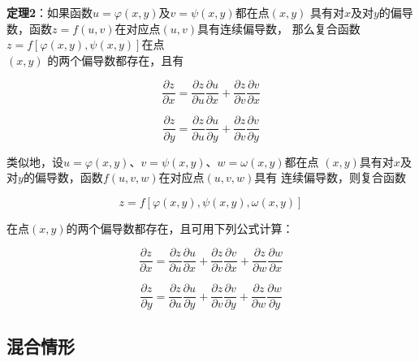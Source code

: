 \documentclass[12pt, a4paper]{article}
\numberwithin{equation}{section}
\begin{document}
    \textbf{定理2}：如果函数\(u=\varphi\left(x,y\right)\)及\(v=\psi\left(x,y\right)\)都在点\(\left(x,y\right)\)
    具有对\(x\)及对\(y\)的偏导数，函数\(z=f\left(u,v\right)\)在对应点\(\left(u,v\right)\)具有连续偏导数，
    那么复合函数\(z=f\left[\varphi\left(x,y\right), \psi\left(x,y\right)\right]\)在点\\\(\left(x,y\right)\)
    的两个偏导数都存在，且有

    \begin{equation}
        \frac{\partial z}{\partial x}=\frac{\partial z}{\partial u} \frac{\partial u}{\partial x}
        +\frac{\partial z}{\partial v} \frac{\partial v}{\partial x}
    \end{equation}

    \begin{equation}
        \frac{\partial z}{\partial y}=\frac{\partial z}{\partial u} \frac{\partial u}{\partial y}
        +\frac{\partial z}{\partial v} \frac{\partial v}{\partial y}
    \end{equation}

    类似地，设\(u=\varphi\left(x,y\right)\)、\(v=\psi\left(x,y\right)\)、\(w=\omega\left(x,y\right)\)都在点
    \(\left(x,y\right)\)具有对\(x\)及对\(y\)的偏导数，函数$f\left(u,v,w\right)$在对应点\(\left(u,v,w\right)\)具有
    连续偏导数，则复合函数
    
    $$
        z=f\left[\varphi(x,y), \psi(x,y), \omega(x,y)\right]
    $$

    在点\(\left(x,y\right)\)的两个偏导数都存在，且可用下列公式计算：

    \begin{equation}
        \frac{\partial z}{\partial x}=\frac{\partial z}{\partial u} \frac{\partial u}{\partial x}+
        \frac{\partial z}{\partial v} \frac{\partial v}{\partial x}+\frac{\partial z}{\partial w} \frac{\partial w}{\partial x}
    \end{equation}

    \begin{equation}
        \frac{\partial z}{\partial y}=\frac{\partial z}{\partial u} \frac{\partial u}{\partial y}+
        \frac{\partial z}{\partial v} \frac{\partial v}{\partial y}+\frac{\partial z}{\partial w} \frac{\partial w}{\partial y}
    \end{equation}

\subsection{混合情形}
\end{document}
